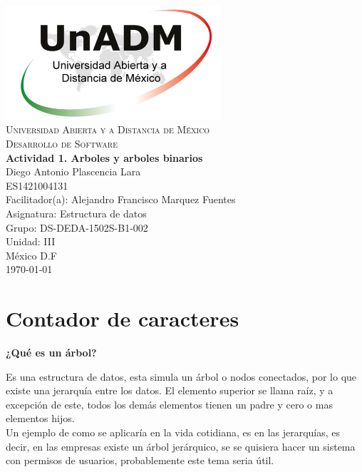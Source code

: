 \documentclass[spanish,12pt,letterpapper]{article}
\begin{document}
	\begin{titlepage}
		\begin{center}
			\includegraphics[width=0.6\textwidth]{../logoUnADM}~\\[1cm] 
			\textsc{Universidad Abierta y a Distancia de M\'exico}\\[0.8cm]
			\textsc{Desarrollo de Software}\\[1.8cm]
			
			\textbf{ \Large Actividad 1. Arboles y arboles binarios}\\[3cm]
			
			Diego Antonio Plascencia Lara\\ ES1421004131 \\[0.4cm]
			Facilitador(a): Alejandro Francisco Marquez Fuentes\\
			Asignatura: Estructura de datos\\
			Grupo: DS-DEDA-1502S-B1-002 \\
			Unidad: III \\
			
			\vfill M\'exico D.F\\{\today}
			
		\end{center}
	\end{titlepage}
	
	\section{Contador de caracteres \\}
	\textbf{¿Qué es un árbol?\\}
	
	Es una estructura de datos, esta simula un árbol o nodos conectados, por lo que existe una jerarquía entre los datos. El elemento superior se llama raíz, y a excepción de este, todos los demás elementos tienen un padre y cero o mas elementos hijos.\\
	
	Un ejemplo de como se aplicaría en la vida cotidiana, es en las jerarquías, es decir, en las empresas existe un árbol jerárquico, se se quisiera hacer un sistema con permisos de usuarios, probablemente este tema seria útil.\\
	
\end{document}
